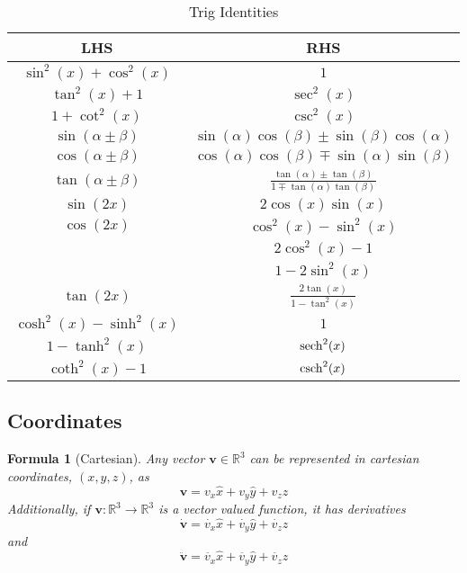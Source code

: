 \documentclass[12pt]{article}
\newtheorem{for}[thm]{Formula}
\theoremstyle{definition}
\theoremstyle{remark}
\numberwithin{equation}{section}
\newcommand\R{\mathbb R}    %
\newcommand\B[1]{\textbf{#1}}
\begin{document}
\vspace{15pt}

\bgroup
\def\arraystretch{1.5}
\begin{table}[H]
        \centering
        \caption{Trig Identities}
        \begin{tabular}{c|c}
                LHS & RHS \\ \hline
                $\sin^2(x) + \cos^2(x)$ & $1$ \\
                $\tan^2(x) + 1$ & $\sec^2(x)$ \\
                $1 + \cot^2(x)$ & $\csc^2(x)$ \\
                $\sin(\alpha \pm \beta)$ & $\sin(\alpha)\cos(\beta) \pm \sin(\beta)\cos(\alpha)$ \\
                $\cos(\alpha \pm \beta)$ & $\cos(\alpha)\cos(\beta) \mp \sin(\alpha)\sin(\beta)$ \\
                $\tan(\alpha \pm \beta)$ & $\frac{\tan(\alpha) \pm \tan(\beta)}{1 \mp \tan(\alpha)\tan(\beta)}$ \\
                $\sin(2x)$ & $2\cos(x)\sin(x)$ \\
                $\cos(2x)$ & $\cos^2(x) - \sin^2(x)$ \\
                & $2\cos^2(x) - 1$ \\
                & $1 - 2\sin^2(x)$ \\
                $\tan(2x)$ & $\frac{2\tan(x)}{1-\tan^2(x)}$ \\
                $\cosh^2(x) - \sinh^2(x)$ & $1$ \\
                $1 - \tanh^2(x)$ & $\sech^2(x)$ \\
                $\coth^2(x) - 1$ & $\csch^2(x)$ \\
        \end{tabular}
\end{table}
\egroup



\subsection{Coordinates}


\begin{for}[Cartesian]
        Any vector $\B{v} \in \R^3$ can be represented in cartesian coordinates, $(x,y,z)$, as
        \begin{equation}
                \B{v} = v_x\hat{x} + v_y\hat{y} + v_z\hat{z}
        \end{equation}
        Additionally, if $\B{v}:\R^3 \rightarrow \R^3$ is a vector valued function, it has derivatives 
        \begin{equation}
                \dot{\B{v}} = \dot{v_x}\hat{x} + \dot{v_y}\hat{y} + \dot{v_z}\hat{z}
        \end{equation}
        and
        \begin{equation}
                \ddot{\B{v}} = \ddot{v_x}\hat{x} + \ddot{v_y}\hat{y} + \ddot{v_z}\hat{z}
        \end{equation}
\end{for}
\end{document}
